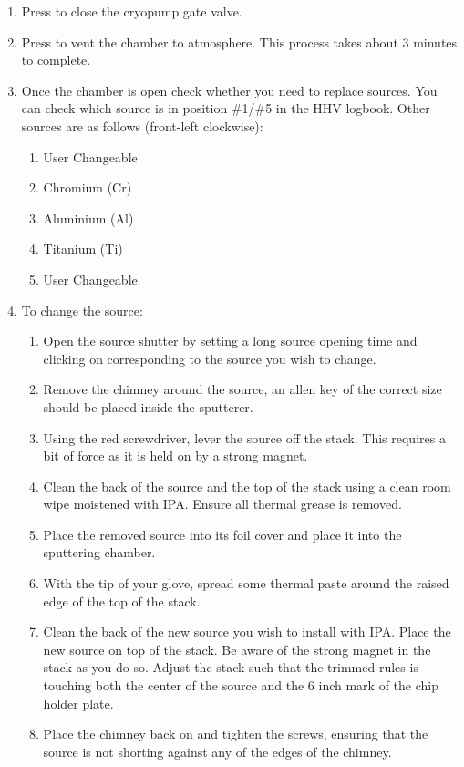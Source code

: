 \begin{enumerate}
\item Press  to close the cryopump gate valve.
\item Press  to vent the chamber to atmosphere. This process takes about 3 minutes to complete.
\item Once the chamber is open check whether you need to replace sources. You can check which source is in position \#1/\#5 in the HHV logbook. Other sources are as follows (front-left clockwise):
\begin{enumerate}[label=Source~\#\arabic*:]
  \item User Changeable
  \item Chromium (Cr)
  \item Aluminium (Al)
  \item Titanium (Ti)
  \item User Changeable
\end{enumerate}
\item To change the source:
\begin{enumerate} 
  \item Open the source shutter by setting a long source opening time and clicking on  corresponding to the source you wish to change.
  \item Remove the chimney around the source, an allen key of the correct size should be placed inside the sputterer.
  \item Using the red screwdriver, lever the source off the stack. This requires a bit of force as it is held on by a strong magnet.
  \item Clean the back of the source and the top of the stack using a clean room wipe moistened with IPA. Ensure all thermal grease is removed.
  \item Place the removed source into its foil cover and place it into the sputtering chamber.
  \item With the tip of your glove, spread some thermal paste around the raised edge of the top of the stack.
  \item Clean the back of the new source you wish to install with IPA. Place the new source on top of the stack. Be aware of the strong magnet in the stack as you do so.
  Adjust the stack such that the trimmed rules is touching both the center of the source and the 6 inch mark of the chip holder plate.
  \item Place the chimney back on and tighten the screws, ensuring that the source is not shorting against any of the edges of the chimney.

\end{enumerate}
\end{enumerate}
